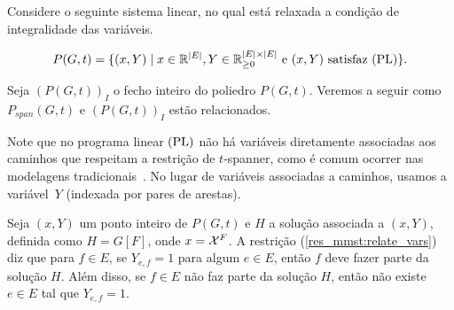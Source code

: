 \smallskip


Considere o seguinte sistema linear, no qual está  relaxada a condição de integralidade
das variáveis. 


\begin{lpformulation}[\PGtrestricoes]
\end{lpformulation}



$$P(G,t)= \{(x, Y)\; |\; x \in \mathbb{R}^{|E|}, Y \in \mathbb{R}^{|E| \times |E|}_{\ge 0} \text{ e } (x,Y) \text{ satisfaz } \rm{(PL)}\}.$$


\medskip

Seja $(P(G,t))_{I}$ o fecho inteiro do poliedro $P(G,t)$. Veremos a seguir 
como $P_{span}(G,t)$ e  $(P(G,t))_{I}$ estão relacionados.
%




Note que no programa linear $\rm{(PL)}$ não há variáveis diretamente associadas
aos caminhos que respeitam a restrição de $t$-spanner, como é comum
ocorrer nas modelagens tradicionais~\cite{SigurdZ2004,DinitzK2011}. 
No lugar de variáveis associadas a caminhos, usamos a variável~$Y$
(indexada por pares de arestas). 

Seja $(x,Y)$ um ponto inteiro de $P(G,t)$ e $H$ a solução associada a
$(x,Y)$, definida como $H= G[F]$, onde $x=\mathcal{X}^{F}$. 
A restrição (\ref{res_mmst:relate_vars}) 
diz que para $f \in E$, se $Y_{e,f} = 1$ para algum $e \in E$, então $f$ 
deve fazer parte da solução $H$. Além disso, se $f \in E$ 
não faz parte da solução $H$, então não existe $e \in E$ tal que $Y_{e,f} = 1$. 

